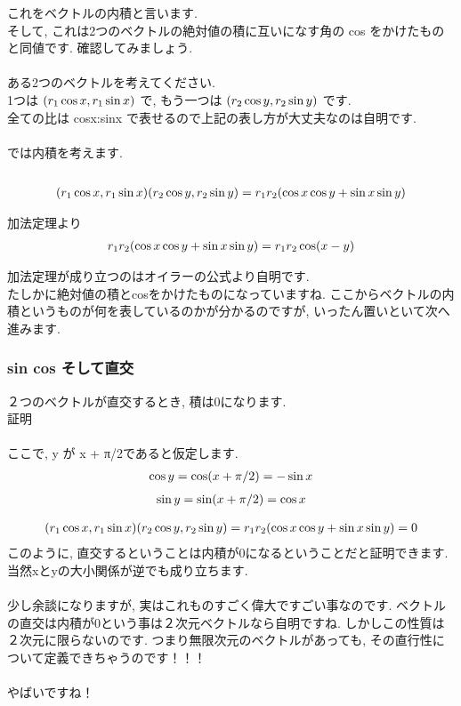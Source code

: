 \documentclass[11pt,a4paper]{jsarticle}
\begin{document}
これをベクトルの内積と言います.\\
そして, これは2つのベクトルの絶対値の積に互いになす角の cos をかけたものと同値です. 確認してみましょう.\\
\\
ある2つのベクトルを考えてください.\\
1つは $(\mathstrut r_1\cos x , \mathstrut r_1\sin x)$ で, もう一つは 
$(\mathstrut r_2\cos y , \mathstrut r_2\sin y)$ です.
\\
全ての比は cosx:sinx で表せるので上記の表し方が大丈夫なのは自明です.\\
\\
では内積を考えます.\\
\\
\begin{eqnarray}
(\mathstrut r_1\cos x, \mathstrut r_1\sin x)(\mathstrut r_2\cos y, \mathstrut r_2\sin y) = \mathstrut r_1\mathstrut r_2(\cos x\cos y + \sin x\sin y)
\end{eqnarray}

加法定理より
\begin{eqnarray}
\mathstrut r_1\mathstrut r_2(\cos x\cos y + \sin x\sin y) = \mathstrut r_1\mathstrut r_2\cos (\mathstrut x- \mathstrut y)
\end{eqnarray}

加法定理が成り立つのはオイラーの公式より自明です.\\
たしかに絶対値の積とcosをかけたものになっていますね. ここからベクトルの内積というものが何を表しているのかが分かるのですが, いったん置いといて次へ進みます.\\

\subsubsection{sin cos そして直交}
２つのベクトルが直交するとき, 積は0になります.\\
証明\\
\\
ここで, y が x + π/2であると仮定します.\\
\begin{eqnarray}
\cos y = \cos (\mathstrut x + \pi/2) = -\sin x
\end{eqnarray}
\begin{eqnarray}
\sin y = \sin (\mathstrut x + \pi/2) = \cos x
\end{eqnarray}

\begin{eqnarray}
(\mathstrut r_1\cos x, \mathstrut r_1\sin x)(\mathstrut r_2\cos y, \mathstrut r_2\sin y) = \mathstrut r_1\mathstrut r_2(\cos x\cos y + \sin x\sin y) = 0
\end{eqnarray}
このように, 直交するということは内積が0になるということだと証明できます. 当然xとyの大小関係が逆でも成り立ちます.\\
\\
少し余談になりますが, 実はこれものすごく偉大ですごい事なのです. ベクトルの直交は内積が0という事は２次元ベクトルなら自明ですね. しかしこの性質は２次元に限らないのです. つまり無限次元のベクトルがあっても, その直行性について定義できちゃうのです！！！\\
\\
やばいですね！\\
\end{document}
